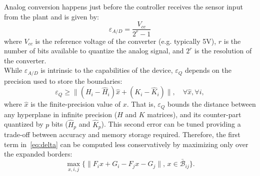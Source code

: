 %
 	Analog conversion happens just before the controller receives the sensor input from the plant
 	and is given by:
 	\begin{equation*}
 	\varepsilon_{A/D}=\frac{V_{cc}}{2^{r}-1}
 	\end{equation*}
 	where $V_{cc}$ is the reference voltage of the converter (e.g. typically 5V), $r$
 	is the number of bits available to quantize the analog signal, and $2^{r}$ is
 	the resolution of the converter.\\
 	While $\varepsilon_{A/D}$ is intrinsic to the capabilities of the device,
 	$\varepsilon_{Q}$ depends on the precision used to store the boundaries:
 	\begin{equation}\label{eq:quantizationlines}
 	\varepsilon_{Q} \ge  \|(H_i - \hat{H}_i) \hat{x} + (K_i - \hat{K}_i)\|, \quad \forall \hat{x},\forall i,
 	\end{equation}
 	where $\hat{x}$ is the finite-precision value of $x$.
 	That is, $\varepsilon_{Q}$ bounds the distance between any hyperplane in infinite
 	precision ($H$ and $K$ matrices), and its counter-part quantized by $p$ bits 
 	($\hat{H}_{p}$ and $\hat{K}_{p}$).
 	This second error can be tuned providing a trade-off between accuracy and
 	memory storage required.
 	Therefore, the first term in~\autoref{eq:delta} can be computed less conservatively by maximizing only over 
 	the expanded borders:
 	\begin{equation}
 	\label{eq:maximization}
 	\max_{x,i,j}\{\|F_ix+G_i-F_jx-G_j\|,\,x\in \bar{\mathcal B}_{ij}\}.
 	\end{equation}
 

